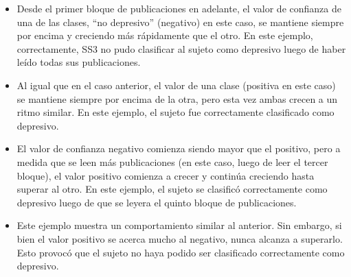 \begin{itemize}
\item[(a)]
Desde el primer bloque de publicaciones en adelante, el valor de confianza de una de las clases,  ``no depresivo'' (negativo) en este caso, se mantiene siempre por encima y creciendo más rápidamente que el otro. En este ejemplo, correctamente, SS3 no pudo clasificar al sujeto como depresivo luego de haber leído todas sus publicaciones.
\item[(b)]
Al igual que en el caso anterior, el valor de una clase (positiva en este caso) se mantiene siempre por encima de la otra, pero esta vez ambas crecen a un ritmo similar. En este ejemplo, el sujeto fue correctamente clasificado como depresivo.
\item[(c)]
El valor de confianza negativo comienza siendo mayor que el positivo, pero a medida que se leen más publicaciones (en este caso, luego de leer el tercer bloque), el valor positivo comienza a crecer y continúa creciendo hasta superar al otro. En este ejemplo, el sujeto se clasificó correctamente como depresivo luego de que se leyera el quinto bloque de publicaciones.
\item[(d)]
Este ejemplo muestra un comportamiento similar al anterior. Sin embargo, si bien el valor positivo se acerca mucho al negativo, nunca alcanza a superarlo. Esto provocó que  el sujeto no haya podido ser clasificado correctamente como depresivo.
\end{itemize}

